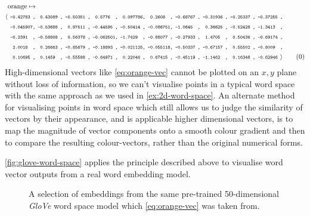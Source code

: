 \documentclass{ucetd}
\begin{document}
\begin{align*}
  &\text{orange}\mapsto\\
  \text{\small{$\langle$}}
  &\texttt{\scriptsize ~-0.42783~,~~0.43089~,~-0.50351~,~~0.5776~~,~~0.097786,~~0.2608~~,~-0.68767~,~-0.31936~,~-0.25337~,~-0.37255~,}\\
  &\texttt{\scriptsize ~-0.045907,~-0.53688~,~~0.97511~,~-0.44595~,~-0.50414~,~-0.086751,~-1.0645~~,~~0.36625~,~-0.52428~,~-1.3413~~,}\\
  &\texttt{\scriptsize ~-0.2391~~,~-0.58808~,~~0.56378~,~-0.062501,~-1.7429~~,~-0.88077~,~-0.27933~,~~1.4705~~,~~0.50436~,~-0.69174~,}\\
  &\texttt{\scriptsize ~~2.0018~~,~~0.26663~,~-0.85679~,~-0.18893~,~-0.021125,~-0.055118,~-0.50337~,~-0.67157~,~~0.55502~,~-0.8009~~,}\\
  &\texttt{\scriptsize ~~0.10695~,~~0.1459~~,~-0.55588~,~-0.64971~,~~0.22046~,~~0.67415~,~-0.45119~,~-1.1462~~,~~0.16348~,~-0.62946~}
  \text{\small{$\rangle$}}\tag{\theequation}\label{eq:orange-vec}\vspace{-1.0em}
\end{align*}
High-dimensional vectors like \eqref{eq:orange-vec} cannot be plotted on an $x,y$ plane without loss of information, so we can't visualise points in a typical word space with the same approach as we used in \autoref{ex:2d-word-space}. An alternate method for visualising points in word space which still allows us to judge the similarity of vectors by their appearance, and is applicable higher dimensional vectors, is to map the magnitude of vector components onto a smooth colour gradient and then to compare the resulting colour-vectors, rather than the original numerical forms.
\begin{example}\label{ex:glove-word-space}%
\autoref{fig:glove-word-space} applies the principle described above to visualise word vector outputs from a real word embedding model.
\begin{figure}[H]%
  \captionsetup{width=.91\linewidth}
 \centering
 
 \caption{A selection of embeddings from the same pre-trained 50-dimensional \emph{GloVe} word space model which \eqref{eq:orange-vec} was taken from.}\label{fig:glove-word-space}
 \centering
\end{figure}
\end{example}
\end{document}
